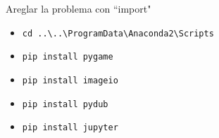 \documentclass{beamer}
\begin{document}
\begin{frame}{Areglar la problema con ``import"}
   \begin{itemize}
      \item \texttt{cd ..\textbackslash..\textbackslash ProgramData\textbackslash Anaconda2\textbackslash Scripts}
      \item \texttt{pip install pygame}
      \item \texttt{pip install imageio}
      \item \texttt{pip install pydub}
      \item \texttt{pip install jupyter}
   \end{itemize}
\end{frame}
\end{document}
